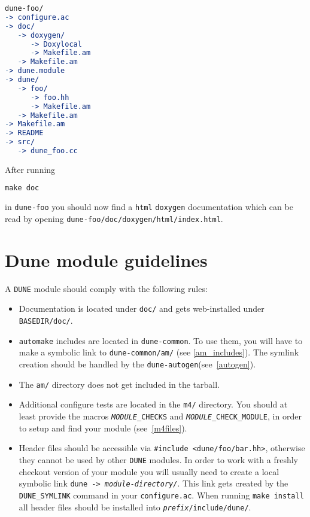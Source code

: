 \documentclass[11pt,a4paper,headinclude,footinclude,DIV16,normalheadings]{scrartcl}
\newcommand{\dune}{\texttt{DUNE}\xspace}
\newcommand{\automake}{\texttt{automake}\xspace}
\newcommand{\autogen}{\texttt{dune-autogen}\xspace}
\newcommand{\configureac}{\texttt{configure.ac}\xspace}
\newcommand{\dunecommon}{\texttt{dune-common}\xspace}
\begin{document}
\begin{lstlisting}[language=make]
dune-foo/
-> configure.ac
-> doc/
   -> doxygen/
      -> Doxylocal
      -> Makefile.am
   -> Makefile.am
-> dune.module
-> dune/
   -> foo/
      -> foo.hh
      -> Makefile.am
   -> Makefile.am
-> Makefile.am
-> README
-> src/
   -> dune_foo.cc
\end{lstlisting}

After running
\begin{lstlisting}[language=make]
make doc
\end{lstlisting}
in \texttt{dune-foo} you should now find a
\texttt{html} \texttt{doxygen} documentation which can be read by opening
\texttt{dune-foo/doc/doxygen/html/index.html}.

\section{Dune module guidelines}\label{section::dune_module_guidelines}
\label{guidelines}

A \dune module should comply with the following rules:
\begin{itemize}
\item Documentation is located under \texttt{doc/} and gets
  web-installed under \texttt{BASEDIR/doc/}.
\item \automake includes are located in \dunecommon. To use them, you
  will have to make a symbolic link to \texttt{dune-common/am/} (see
  \ref{am_includes}). The symlink creation should be handled by the
  \autogen (see~\ref{autogen}).
\item The \texttt{am/} directory does not get included in the tarball.
\item Additional configure tests are located in the \texttt{m4/}
  directory. You should at least provide the macros \texttt{\emph{MODULE}\_CHECKS}
  and \texttt{\emph{MODULE}\_CHECK\_MODULE}, in order to setup and
  find your module (see~\ref{m4files}).
\item Header files should be accessible via \verb!#include <dune/foo/bar.hh>!,
  otherwise they cannot be used by other \dune modules. In order to work
  with a freshly checkout version of your module you will usually need
  to create a local symbolic link \texttt{dune ->
    \textit{module-directory/}}. This link gets created by the
  \texttt{DUNE\_SYMLINK} command in your \configureac. When running
  \texttt{make install} all header files should be installed into
  \texttt{\textit{prefix}/include/dune/}.
\end{itemize}
\end{document}
